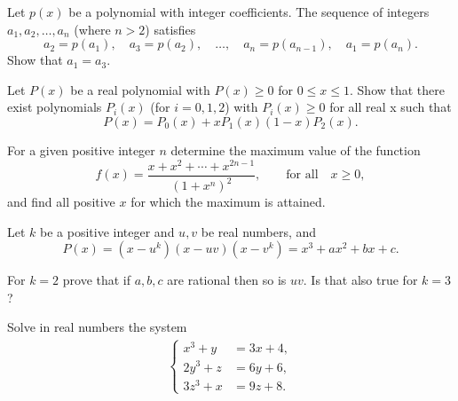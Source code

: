 \begin{question}[name={1990 Austrian--Polish}]
    Let $p(x)$ be a polynomial with integer coefficients. The sequence of integers $a_1, a_2, \dots , a_n$ (where $n > 2$) satisfies
    \[a_2 = p(a_1), \quad a_3 = p(a_2),\quad \dots , \quad a_n = p(a_{n-1}),\quad a_1 = p(a_n).\] Show that $a_1 = a_3$.
\end{question}




\begin{question}[name={1991 Austrian--Polish}]
    Let $P(x)$ be a real polynomial with $P(x) \ge 0$ for $0 \le x \le  1$. Show that there exist polynomials $P_i (x)$ (for $i = 0, 1,2$) with $P_i (x) \ge 0$ for all real x such that \[P (x) = P_0 (x) + xP_1 (x)( 1- x)P_2 (x).\]
\end{question}




\begin{question}[name={1991 Austrian--Polish}]
    For a given positive integer $n$ determine the maximum value of the function \[f (x) = \frac{x + x^2 +\cdots+ x^{2n-1}}{(1 + x^n)^2}, \qquad \text{for all} \quad x \geq 0,\] and find all positive $x$ for which the maximum is attained.
\end{question}




\begin{question}[name={1992 Austrian--Polish}]
    Let $k$ be a positive integer and $u, v$ be real numbers, and \[P(x) = (x - u^k) (x - uv) (x -v^k) = x^3 + ax^2 + bx + c.\]
    \begin{tasks}
        \task For $k = 2$ prove that if $a, b, c$ are rational then so is $uv$.
        \task Is that also true for $k = 3$?
    \end{tasks}
\end{question}




\begin{question}[name={1993 Austrian--Polish}]
    Solve in real numbers the system
    \begin{align*}
        \begin{cases}
            x^3 + y  &= 3x + 4,\\
            2y^3 + z &= 6y + 6,\\
            3z^3 + x &= 9z + 8.
        \end{cases}
    \end{align*}
\end{question}




